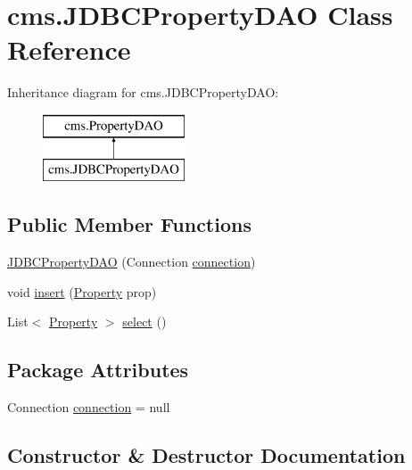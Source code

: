 \hypertarget{classcms_1_1_j_d_b_c_property_d_a_o}{}\section{cms.\+J\+D\+B\+C\+Property\+D\+AO Class Reference}
\label{classcms_1_1_j_d_b_c_property_d_a_o}
Inheritance diagram for cms.\+J\+D\+B\+C\+Property\+D\+AO\+:\begin{figure}[H]
\begin{center}
\leavevmode
\includegraphics[height=2.000000cm]{classcms_1_1_j_d_b_c_property_d_a_o}
\end{center}
\end{figure}
\subsection*{Public Member Functions}
\begin{DoxyCompactItemize}
\item 
\mbox{\hyperlink{classcms_1_1_j_d_b_c_property_d_a_o_aa41812a8d2030b224507345fe715e729}{J\+D\+B\+C\+Property\+D\+AO}} (Connection \mbox{\hyperlink{classcms_1_1_j_d_b_c_property_d_a_o_abf9c487234968fce867ee559ed4ccd59}{connection}})
\item 
void \mbox{\hyperlink{classcms_1_1_j_d_b_c_property_d_a_o_a5fc189c30f4112d03a6de691b1747667}{insert}} (\mbox{\hyperlink{classcms_1_1_property}{Property}} prop)
\item 
List$<$ \mbox{\hyperlink{classcms_1_1_property}{Property}} $>$ \mbox{\hyperlink{classcms_1_1_j_d_b_c_property_d_a_o_a2858ac4d2c7cc8345a02e2ebb555c7f7}{select}} ()
\end{DoxyCompactItemize}
\subsection*{Package Attributes}
\begin{DoxyCompactItemize}
\item 
Connection \mbox{\hyperlink{classcms_1_1_j_d_b_c_property_d_a_o_abf9c487234968fce867ee559ed4ccd59}{connection}} = null
\end{DoxyCompactItemize}


\subsection{Constructor \& Destructor Documentation}
\mbox{\label{classcms_1_1_j_d_b_c_property_d_a_o_aa41812a8d2030b224507345fe715e729}} 
